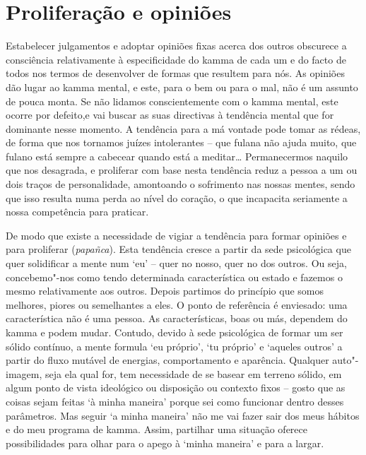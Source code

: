 \section{Proliferação e opiniões}

Estabelecer julgamentos e adoptar opiniões fixas acerca dos outros obscurece a
consciência relativamente à especificidade do kamma de cada um e do facto de
todos nos termos de desenvolver de formas que resultem para nós. As opiniões dão
lugar ao kamma mental, e este, para o bem ou para o mal, não é um assunto de
pouca monta. Se não lidamos conscientemente com o kamma mental, este ocorre por
defeito,e vai buscar as suas directivas à tendência mental que for dominante
nesse momento. A tendência para a má vontade pode tomar as rédeas, de forma que
nos tornamos juízes intolerantes -- que fulana não ajuda muito, que fulano está
sempre a cabecear quando está a meditar\ldots{} Permanecermos naquilo que nos
desagrada, e proliferar com base nesta tendência reduz a pessoa a um ou dois
traços de personalidade, amontoando o sofrimento nas nossas mentes, sendo que
isso resulta numa perda ao nível do coração, o que incapacita seriamente a nossa
competência para praticar.

De modo que existe a necessidade de vigiar a tendência para formar opiniões e
para proliferar (\emph{papañca}).
Esta tendência cresce a partir da sede psicológica que quer solidificar a mente
num `eu' -- quer no nosso, quer no dos outros. Ou seja, concebemo"-nos como
tendo determinada característica ou estado e fazemos o mesmo relativamente aos
outros. Depois partimos do princípio que somos melhores, piores ou semelhantes a
eles. O ponto de referência é enviesado: uma característica não é uma pessoa. As
características, boas ou más, dependem do kamma e podem mudar. Contudo, devido à
sede psicológica de formar um ser sólido contínuo, a mente formula `eu próprio',
`tu próprio' e `aqueles outros' a partir do fluxo mutável de energias,
comportamento e aparência. Qualquer auto"-imagem, seja ela qual for, tem
necessidade de se basear em terreno sólido, em algum ponto de vista ideológico
ou disposição ou contexto fixos -- gosto que as coisas sejam feitas `à minha
maneira' porque sei como funcionar dentro desses parâmetros. Mas seguir `a minha
maneira' não me vai fazer sair dos meus hábitos e do meu programa de kamma.
Assim, partilhar uma situação oferece possibilidades para olhar para o apego à
`minha maneira' e para a largar.

